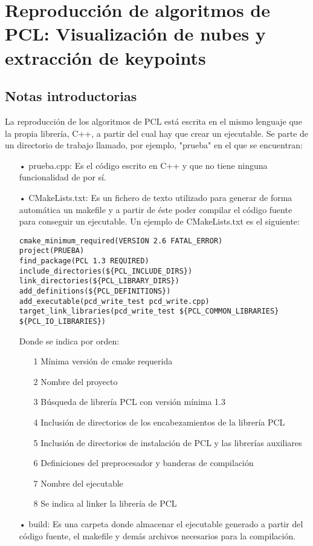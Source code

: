 \chapter{Reproducción de algoritmos de PCL: Visualización de nubes y extracción de keypoints}
\section{Notas introductorias}
La reproducción de los algoritmos de PCL está escrita en el mismo lenguaje que la propia librería, C++, a partir del cual hay que crear un ejecutable. Se parte de un directorio de trabajo llamado, por ejemplo, "prueba" en el que se encuentran:

\begin{itemize}
\item[•]prueba.cpp: Es el código escrito en C++ y que no tiene ninguna funcionalidad de por sí. 

\item[•]CMakeLists.txt: Es un fichero de texto utilizado para generar de forma automática un makefile y a partir de éste poder compilar el código fuente para conseguir un ejecutable. Un ejemplo de CMakeLists.txt es el siguiente:

\begin{lstlisting}
cmake_minimum_required(VERSION 2.6 FATAL_ERROR)	
project(PRUEBA)	
find_package(PCL 1.3 REQUIRED)	
include_directories(${PCL_INCLUDE_DIRS})	
link_directories(${PCL_LIBRARY_DIRS})	
add_definitions(${PCL_DEFINITIONS})	
add_executable(pcd_write_test pcd_write.cpp)	
target_link_libraries(pcd_write_test ${PCL_COMMON_LIBRARIES} ${PCL_IO_LIBRARIES})	
\end{lstlisting}

Donde se indica por orden: 

\begin{itemize}
\item[1]Mínima versión de cmake requerida
\item[2]Nombre del proyecto
\item[3]Búsqueda de librería PCL con versión mínima 1.3
\item[4]Inclusión de directorios de los encabezamientos de la librería PCL
\item[5]Inclusión de directorios de instalación de PCL y las librerías auxiliares
\item[6]Definiciones del preprocesador y banderas de compilación
\item[7]Nombre del ejecutable 
\item[8]Se indica al linker la librería de PCL
\end{itemize}

\item[•]build: Es una carpeta donde almacenar el ejecutable generado a partir del código fuente, el makefile y demás archivos necesarios para la compilación.
\end{itemize}

